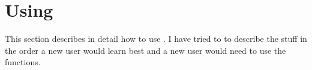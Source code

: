 
\newpage
\section{Using \tonelib}
This section describes in detail how to use \tonelib. I have tried to
to describe the stuff in the order a new user would learn best and a new user
would need to use the functions. 



